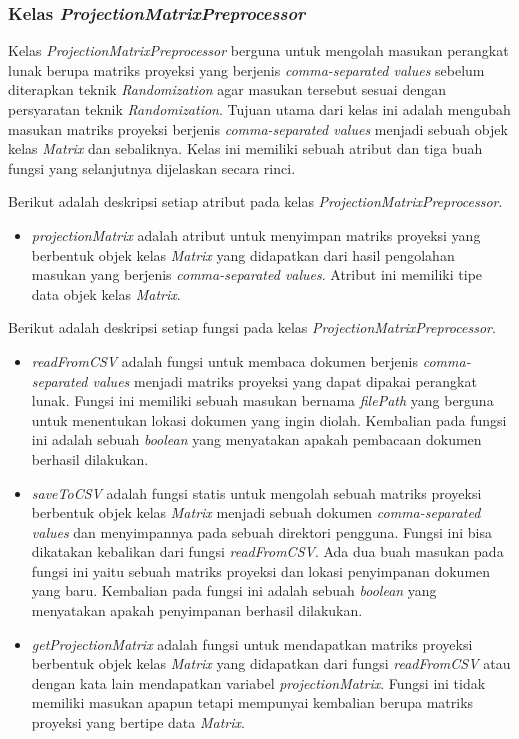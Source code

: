 \subsubsection{Kelas \textit{ProjectionMatrixPreprocessor}}
\label{subsubsec:kelas-projectionpre}

Kelas \textit{ProjectionMatrixPreprocessor} berguna untuk mengolah masukan perangkat lunak berupa matriks proyeksi yang berjenis \textit{comma-separated values} sebelum diterapkan teknik \textit{Randomization} agar masukan tersebut sesuai dengan persyaratan teknik \textit{Randomization}. Tujuan utama dari kelas ini adalah mengubah masukan matriks proyeksi berjenis \textit{comma-separated values} menjadi sebuah objek kelas \textit{Matrix} dan sebaliknya. Kelas ini memiliki sebuah atribut dan tiga buah fungsi yang selanjutnya dijelaskan secara rinci.

Berikut adalah deskripsi setiap atribut pada kelas \textit{ProjectionMatrixPreprocessor}.
\begin{itemize}
	\item \textit{projectionMatrix} adalah atribut untuk menyimpan matriks proyeksi yang berbentuk objek kelas \textit{Matrix} yang didapatkan dari hasil pengolahan masukan yang berjenis \textit{comma-separated values}. Atribut ini memiliki tipe data objek kelas \textit{Matrix}.
\end{itemize}

Berikut adalah deskripsi setiap fungsi pada kelas \textit{ProjectionMatrixPreprocessor}.
\begin{itemize}
	\item \textit{readFromCSV} adalah fungsi untuk membaca dokumen berjenis \textit{comma-separated values} menjadi matriks proyeksi yang dapat dipakai perangkat lunak. Fungsi ini memiliki sebuah masukan bernama \textit{filePath} yang berguna untuk menentukan lokasi dokumen yang ingin diolah. Kembalian pada fungsi ini adalah sebuah \textit{boolean} yang menyatakan apakah pembacaan dokumen berhasil dilakukan.
	\item \textit{saveToCSV} adalah fungsi statis untuk mengolah sebuah matriks proyeksi berbentuk objek kelas \textit{Matrix} menjadi sebuah dokumen \textit{comma-separated values} dan menyimpannya pada sebuah direktori pengguna. Fungsi ini bisa dikatakan kebalikan dari fungsi \textit{readFromCSV}. Ada dua buah masukan pada fungsi ini yaitu sebuah matriks proyeksi dan lokasi penyimpanan dokumen yang baru. Kembalian pada fungsi ini adalah sebuah \textit{boolean} yang menyatakan apakah penyimpanan berhasil dilakukan.
	\item \textit{getProjectionMatrix} adalah fungsi untuk mendapatkan matriks proyeksi berbentuk objek kelas \textit{Matrix} yang didapatkan dari fungsi \textit{readFromCSV} atau dengan kata lain mendapatkan variabel \textit{projectionMatrix}. Fungsi ini tidak memiliki masukan apapun tetapi mempunyai kembalian berupa matriks proyeksi yang bertipe data \textit{Matrix}.
\end{itemize}

